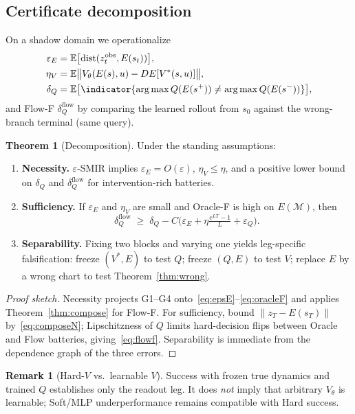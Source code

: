 \documentclass[letterpaper,10pt,twocolumn]{article}
\theoremstyle{definition}
\newtheorem{theorem}{Theorem}
\newtheorem{remark}{Remark}
\newcommand{\EE}{\mathbb{E}}
\newcommand{\cM}{\mathcal{M}}
\begin{document}
\subsection{Certificate decomposition}
On a shadow domain we operationalize
\begin{align}
\varepsilon_E
&=\EE\big[\mathrm{dist}(z_t^{\mathrm{obs}},E(s_t))\big],
\label{eq:epsE}\\
\eta_V
&=\EE\big\|V_\theta(E(s),u)-DE[V^*(s,u)]\big\|,
\label{eq:etaV}\\
\delta_Q
&=\EE\big[\indicator\{\arg\max Q(E(s^+))\neq \arg\max Q(E(s^-))\}\big],
\label{eq:oracleF}
\end{align}
and Flow-F $\delta_Q^{\mathrm{flow}}$ by comparing the learned rollout from $s_0$ against the wrong-branch terminal (same query).

\begin{theorem}[Decomposition]
\label{thm:decomp}
Under the standing assumptions:
\begin{enumerate}[leftmargin=*]
\item \textbf{Necessity.}
$\varepsilon$-SMIR implies $\varepsilon_E=O(\varepsilon)$, $\eta_V\le\eta$, and a positive lower bound on $\delta_Q$ and $\delta_Q^{\mathrm{flow}}$ for intervention-rich batteries.
\item \textbf{Sufficiency.}
If $\varepsilon_E$ and $\eta_V$ are small and Oracle-F is high on $E(\cM)$, then
\begin{equation}
\delta_Q^{\mathrm{flow}}
\;\ge\;
\delta_Q
- C\Big(\varepsilon_E+\eta\tfrac{e^{LT}-1}{L}+\varepsilon_Q\Big).
\label{eq:flowf}
\end{equation}
\item \textbf{Separability.}
Fixing two blocks and varying one yields leg-specific falsification:
freeze $(V^*,E)$ to test $Q$; freeze $(Q,E)$ to test $V$; replace $E$ by a wrong chart to test Theorem~\ref{thm:wrong}.
\end{enumerate}
\end{theorem}
\begin{proof}[Proof sketch]
Necessity projects G1--G4 onto~\eqref{eq:epsE}--\eqref{eq:oracleF} and applies Theorem~\ref{thm:compose} for Flow-F.
For sufficiency, bound $\|z_T-E(s_T)\|$ by~\eqref{eq:composeN}; Lipschitzness of $Q$ limits hard-decision flips between Oracle and Flow batteries, giving~\eqref{eq:flowf}.
Separability is immediate from the dependence graph of the three errors.
\end{proof}

\begin{remark}[Hard-$V$ vs.\ learnable $V$]
\label{rem:hard}
Success with frozen true dynamics and trained $Q$ establishes only the readout leg.
It does \emph{not} imply that arbitrary $V_\theta$ is learnable; Soft/MLP underperformance remains compatible with Hard success.
\end{remark}
\end{document}
